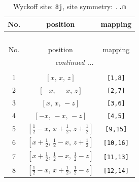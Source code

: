 \documentclass[fleqn,8pt]{jsarticle}
\begin{document}
\begin{longtable}{ccc}
\caption{Wyckoff site: {\tt 8j}, site symmetry: {\tt ..m}}
 \\
 \hline \hline
No. & position & mapping \\ \hline \endfirsthead

\multicolumn{2}{l}{\tablename\ \thetable{}} \\
 \hline \hline
No. & position & mapping \\ \hline \endhead

 \hline \hline
\multicolumn{2}{r}{\footnotesize\it continued ...} \\ \endfoot

 \hline \hline
\multicolumn{2}{r}{} \\ \endlastfoot

1 & $\left[ x,\, x,\, z \right]$ & {\tt [1,8]} \\ \hline
2 & $\left[ - x,\, - x,\, z \right]$ & {\tt [2,7]} \\ \hline
3 & $\left[ x,\, x,\, - z \right]$ & {\tt [3,6]} \\ \hline
4 & $\left[ - x,\, - x,\, - z \right]$ & {\tt [4,5]} \\ \hline
5 & $\left[ \frac{1}{2} - x,\, x + \frac{1}{2},\, z + \frac{1}{2} \right]$ & {\tt [9,15]} \\ \hline
6 & $\left[ x + \frac{1}{2},\, \frac{1}{2} - x,\, z + \frac{1}{2} \right]$ & {\tt [10,16]} \\ \hline
7 & $\left[ x + \frac{1}{2},\, \frac{1}{2} - x,\, \frac{1}{2} - z \right]$ & {\tt [11,13]} \\ \hline
8 & $\left[ \frac{1}{2} - x,\, x + \frac{1}{2},\, \frac{1}{2} - z \right]$ & {\tt [12,14]} \\
\end{longtable}
\renewcommand{\arraystretch}{1.2}
\end{document}
